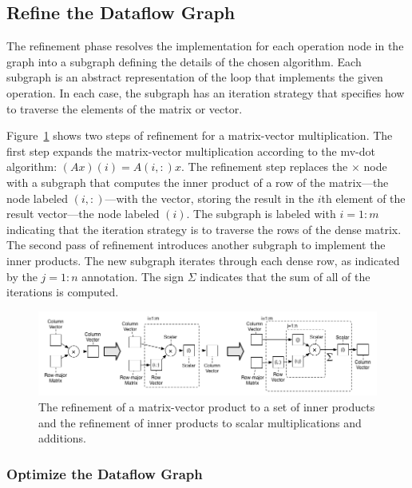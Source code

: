 \documentclass[11pt]{article}
\begin{document}
\subsection{Refine the Dataflow Graph}
\label{sec:refine}

The refinement phase resolves the implementation for each operation node in the graph into a subgraph defining the details of the chosen algorithm.  Each subgraph is an abstract representation of the loop that implements the given operation.  In each case, the subgraph has an iteration strategy that specifies how to traverse the elements of the matrix or vector.

Figure~\ref{fig:refine-mv-dot} shows two steps of refinement for a matrix-vector multiplication. The first step expands the matrix-vector multiplication according to the mv-dot algorithm: $(Ax)(i) = A(i,:)x$.  The refinement step replaces the $\times$ node with a subgraph that computes the inner product of a row of the matrix---the node labeled $(i,:)$---with the vector, storing the result in the $i$th element of the result vector---the node labeled $(i)$. The subgraph is labeled with $i=1\!:\!m$ indicating that the iteration strategy is to traverse the rows of the dense matrix.
%
The second pass of refinement introduces another subgraph to implement the inner products. The new subgraph iterates through each dense row, as indicated by the $j=1:n$ annotation. The sign $\Sigma$ indicates that the sum of all of the iterations is computed.


\begin{figure}[hbtp]
  \centering
  \includegraphics[width=\textwidth]{figures/refine-mv-dot.png}

  \caption{The refinement of a matrix-vector product to a set of inner products and the refinement of inner products to scalar multiplications and additions.}
  \label{fig:refine-mv-dot}
\end{figure}




\subsubsection{Optimize the Dataflow Graph}
\end{document}
